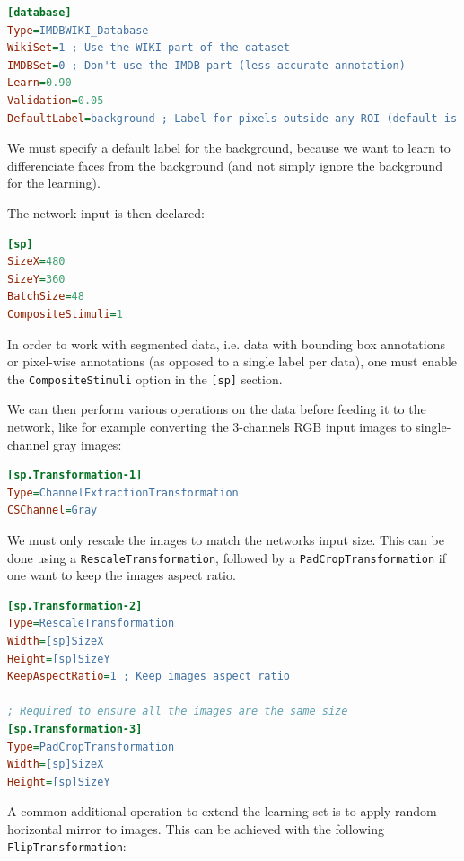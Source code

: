 \documentclass[a4paper,11pt,oneside]{article}
\begin{document}
\begin{lstlisting}[language=ini]
[database]
Type=IMDBWIKI_Database
WikiSet=1 ; Use the WIKI part of the dataset
IMDBSet=0 ; Don't use the IMDB part (less accurate annotation)
Learn=0.90
Validation=0.05
DefaultLabel=background ; Label for pixels outside any ROI (default is no label, pixels are ignored)
\end{lstlisting}

We must specify a default label for the background, because we want to learn to
differenciate faces from the background (and not simply ignore the background
for the learning).

The network input is then declared:
\begin{lstlisting}[language=ini]
[sp]
SizeX=480
SizeY=360
BatchSize=48
CompositeStimuli=1
\end{lstlisting}

In order to work with segmented data, i.e. data with bounding box annotations or
pixel-wise annotations (as opposed to a single label per data), one must enable
the \lstinline!CompositeStimuli! option in the \lstinline![sp]! section.

We can then perform various operations on the data before feeding it to the
network, like for example converting the 3-channels RGB input images to
single-channel gray images:

\begin{lstlisting}[language=ini]
[sp.Transformation-1]
Type=ChannelExtractionTransformation
CSChannel=Gray
\end{lstlisting}

We must only rescale the images to match the networks input size. This can be
done using a \lstinline!RescaleTransformation!, followed by a
\lstinline!PadCropTransformation! if one want to keep the images aspect ratio.

\begin{lstlisting}[language=ini]
[sp.Transformation-2]
Type=RescaleTransformation
Width=[sp]SizeX
Height=[sp]SizeY
KeepAspectRatio=1 ; Keep images aspect ratio

; Required to ensure all the images are the same size
[sp.Transformation-3]
Type=PadCropTransformation
Width=[sp]SizeX
Height=[sp]SizeY
\end{lstlisting}

A common additional operation to extend the learning set is to apply random
horizontal mirror to images. This can be achieved with the following
\lstinline!FlipTransformation!:
\end{document}

